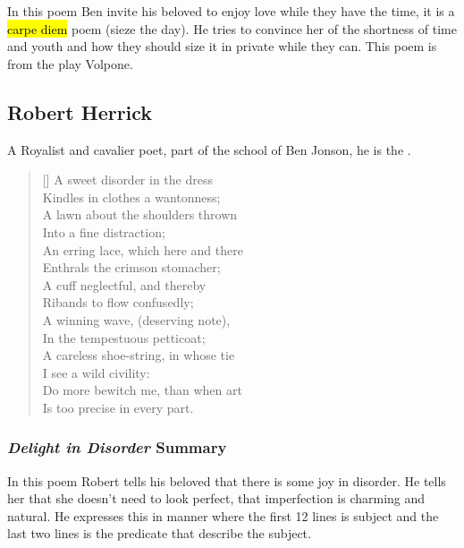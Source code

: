 \documentclass[12pt, a4paper]{article}
\begin{document}
In this poem Ben invite his beloved to enjoy love while 
they have the time, it is a \hl{carpe diem} poem (sieze the day).
He tries to convince her of the shortness of time and youth and how
they should size it in private while they can. This poem is from the play Volpone.


\subsection*{Robert Herrick}
A Royalist and cavalier poet, part of the school of Ben Jonson,
he is the .

\settowidth{\versewidth}{A sweet disorder in the dress. }
\begin{verse}[\versewidth]
{\fontverse
A sweet disorder in the dress\\
Kindles in clothes a wantonness;\\
A lawn about the shoulders thrown\\
Into a fine distraction;\\
An erring lace, which here and there\\
Enthrals the crimson stomacher;\\
A cuff neglectful, and thereby\\
Ribands to flow confusedly;\\
A winning wave, (deserving note),\\
In the tempestuous petticoat;\\
A careless shoe-string, in whose tie\\
I see a wild civility:\\
Do more bewitch me, than when art\\
Is too precise in every part.
}
\end{verse}

\subsubsection*{\textit{Delight in Disorder} Summary}

In this poem Robert tells his beloved that there is
some joy in disorder. He tells her that she doesn't 
need to look perfect, that imperfection is charming and natural.
He expresses this in  manner where
the first 12 lines is subject and the last two lines is the 
predicate that describe the subject.
\end{document}
